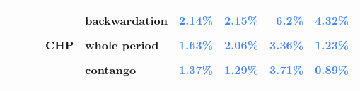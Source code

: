 \documentclass[
  authoryear,
  preprint,
  3p]{elsarticle}
\begin{document}
\begin{landscape}
\begin{longtable}[t]{>{}l>{}l>{}l>{}l>{}l>{}r>{}r>{}r>{}r}
\textbf{\cellcolor{gray!10}{}} & \textbf{\cellcolor{gray!10}{}} & \textbf{\cellcolor{gray!10}{livestock}} & \textbf{\cellcolor{gray!10}{market}} & \textbf{\cellcolor{gray!10}{whole period}} & \textcolor[HTML]{4285f4}{\textbf{\cellcolor{gray!10}{2.96\%}}} & \textcolor[HTML]{4285f4}{\textbf{\cellcolor{gray!10}{1.83\%}}} & \textcolor[HTML]{4285f4}{\textbf{\cellcolor{gray!10}{8.99\%}}} & \textcolor[HTML]{4285f4}{\textbf{\cellcolor{gray!10}{4.84\%}}}\\
\textbf{} & \textbf{} & \textbf{} & \textbf{} & \textbf{backwardation} & \textcolor[HTML]{4285f4}{\textbf{2.14\%}} & \textcolor[HTML]{4285f4}{\textbf{2.15\%}} & \textcolor[HTML]{4285f4}{\textbf{6.2\%}} & \textcolor[HTML]{4285f4}{\textbf{4.32\%}}\\
\addlinespace
\textbf{\cellcolor{gray!10}{}} & \textbf{\cellcolor{gray!10}{}} & \textbf{\cellcolor{gray!10}{}} & \textbf{\cellcolor{gray!10}{}} & \textbf{\cellcolor{gray!10}{contango}} & \textcolor[HTML]{4285f4}{\textbf{\cellcolor{gray!10}{4.03\%}}} & \textcolor[HTML]{4285f4}{\textbf{\cellcolor{gray!10}{1.52\%}}} & \textcolor[HTML]{4285f4}{\textbf{\cellcolor{gray!10}{11.26\%}}} & \textcolor[HTML]{4285f4}{\textbf{\cellcolor{gray!10}{5.94\%}}}\\
\textbf{} & \textbf{} & \textbf{} & \textbf{CHP} & \textbf{whole period} & \textcolor[HTML]{4285f4}{\textbf{1.63\%}} & \textcolor[HTML]{4285f4}{\textbf{2.06\%}} & \textcolor[HTML]{4285f4}{\textbf{3.36\%}} & \textcolor[HTML]{4285f4}{\textbf{1.23\%}}\\
\textbf{\cellcolor{gray!10}{}} & \textbf{\cellcolor{gray!10}{}} & \textbf{\cellcolor{gray!10}{}} & \textbf{\cellcolor{gray!10}{}} & \textbf{\cellcolor{gray!10}{backwardation}} & \textcolor[HTML]{4285f4}{\textbf{\cellcolor{gray!10}{1.95\%}}} & \textcolor[HTML]{4285f4}{\textbf{\cellcolor{gray!10}{2.94\%}}} & \textcolor[HTML]{4285f4}{\textbf{\cellcolor{gray!10}{3.54\%}}} & \textcolor[HTML]{4285f4}{\textbf{\cellcolor{gray!10}{1.94\%}}}\\
\textbf{} & \textbf{} & \textbf{} & \textbf{} & \textbf{contango} & \textcolor[HTML]{4285f4}{\textbf{1.37\%}} & \textcolor[HTML]{4285f4}{\textbf{1.29\%}} & \textcolor[HTML]{4285f4}{\textbf{3.71\%}} & \textcolor[HTML]{4285f4}{\textbf{0.89\%}}\\
\textbf{\cellcolor{gray!10}{}} & \textbf{\cellcolor{gray!10}{}} & \textbf{\cellcolor{gray!10}{}} & \textbf{\cellcolor{gray!10}{open interest}} & \textbf{\cellcolor{gray!10}{whole period}} & \textcolor[HTML]{4285f4}{\textbf{\cellcolor{gray!10}{0.43\%}}} & \textcolor[HTML]{4285f4}{\textbf{\cellcolor{gray!10}{0.55\%}}} & \textcolor[HTML]{4285f4}{\textbf{\cellcolor{gray!10}{0.18\%}}} & \textcolor[HTML]{4285f4}{\textbf{\cellcolor{gray!10}{0.34\%}}}\\

\end{longtable}
\end{landscape}
\end{document}
